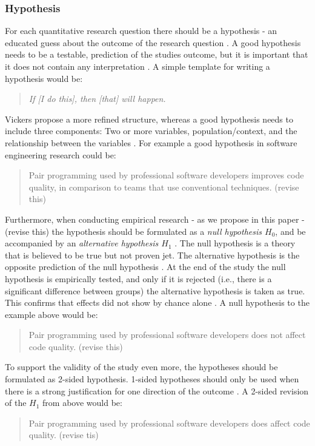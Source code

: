 
\subsubsection{Hypothesis}

For each quantitative research question there should be a hypothesis - an educated guess about the outcome of the research question \cite{Buddies2010,Farrugia2009}. A good hypothesis needs to be a testable, prediction of the studies outcome, but it is important that it does not contain any interpretation \cite{Prasad2001}. A simple template for writing a hypothesis would be:
\begin{quote}
	 \emph{If [I do this], then [that] will happen.} \cite{Buddies2010}
\end{quote}
Vickers \etal propose a more refined structure, whereas a good hypothesis needs to include three components: Two or more variables, population/context, and the relationship between the variables \cite{Vickers}.  For example a good hypothesis in software engineering research could be: 
\begin{quote}
	{\color{red}Pair programming used by professional software developers improves code quality, in comparison to teams that use conventional techniques. (revise this)}
\end{quote}
Furthermore, when conducting empirical research {\color{red}- as we propose in this paper - (revise this)} the hypothesis should be formulated as a \emph{null hypothesis $H_0$}, and be accompanied by an \emph{alternative hypothesis $H_1$} \cite{Farrugia2009}. The null hypothesis is a theory that is believed to be true but not proven jet. The alternative hypothesis is the opposite prediction of the null hypothesis \cite{Prasad2001}. At the end of the study the null hypothesis is empirically tested, and only if it is rejected (i.e., there is a significant difference between groups) the alternative hypothesis is taken as true. This confirms that effects did not show by chance alone \cite{Farrugia2009}. A null hypothesis to the example above would be:
\begin{quote}
	{\color{red}Pair programming used by professional software developers does not affect code quality. (revise this)}
\end{quote}
To support the validity of the study even more, the hypotheses should be formulated as 2-sided hypothesis. \cite[p.280]{Farrugia2009} 1-sided hypotheses should only be used when there is a strong justification for one direction of the outcome \cite{Farrugia2009}. A 2-sided revision of the $H_1$ from above would be: 
\begin{quote}
	{\color{red}Pair programming used by professional software developers does affect code quality. (revise tis)}	
\end{quote}

